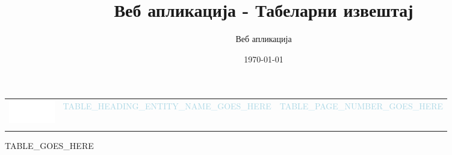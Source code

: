 \documentclass{article}
\title{Веб апликација - Табеларни извештај}
\author{Веб апликација}
\date{\today}
\begin{document}
\pagestyle{fancyplain}
\fancyhf{}
\rhead{ \fancyplain{}{\today} }
\rfoot{ \fancyplain{}{\thepage} }

\sffamily

\noindent

\begin{longtable}{ L{20mm} C{110mm} C{30mm} }
  \textcolor{white}{\includegraphics[width=20mm]{logo}} &
  \textcolor{lightblue}{\Huge{TABLE_HEADING_ENTITY_NAME_GOES_HERE}} &
  \textcolor{lightblue}{TABLE_PAGE_NUMBER_GOES_HERE} \\
   &  & \\
\end{longtable}

TABLE_GOES_HERE
\end{document}
